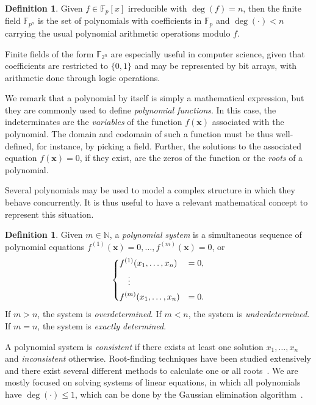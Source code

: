 \documentclass[12pt, a4paper, oneside]{memoir}
\theoremstyle{definition}
\newtheorem{definition}[theorem]{Definition}
\begin{document}
\begin{definition}
  Given $f \in \mathbb{F}_{p}[x]$ irreducible with $\deg(f) = n$, then the finite field $\mathbb{F}_{p^{n}}$ is the set of polynomials with coefficients in $\mathbb{F}_{p}$ and $\deg(\cdot) < n$ carrying the usual polynomial arithmetic operations modulo $f$.
\end{definition}

Finite fields of the form $\mathbb{F}_{2^{n}}$ are especially useful in computer science, given that coefficients are restricted to $\{0, 1\}$ and may be represented by bit arrays, with arithmetic done through logic operations.

We remark that a polynomial by itself is simply a mathematical expression, but they are commonly used to define \emph{polynomial functions}. In this case, the indeterminates are the \emph{variables} of the function $f(\mathbf{x})$ associated with the polynomial. The domain and codomain of such a function must be thus well-defined, for instance, by picking a field. Further, the solutions to the associated equation $f(\mathbf{x}) = 0$, if they exist, are the zeros of the function or the \emph{roots} of a polynomial. 

Several polynomials may be used to model a complex structure in which they behave concurrently. It is thus useful to have a relevant mathematical concept to represent this situation.

\begin{definition}\label{def:poly-sys}
  Given $m \in \mathbb{N}$, a \emph{polynomial system} is a simultaneous sequence of polynomial equations $f^{(1)}(\mathbf{x}) = 0, \dots, f^{(m)}(\mathbf{x}) = 0$, or
  \begin{align}
    \begin{dcases}
      f^{(1)}(x_{1}, \dots, x_{n}) &= 0, \\
      \quad \vdots \\
      f^{(m)}(x_{1}, \dots, x_{n}) &= 0.
    \end{dcases}
  \end{align}
  If $m > n$, the system is \emph{overdetermined}. If $m < n$, the system is \emph{underdetermined}. If $m = n$, the system is \emph{exactly determined}.
\end{definition}

A polynomial system is \emph{consistent} if there exists at least one solution $x_{1}, \dots, x_{n}$ and \emph{inconsistent} otherwise. Root-finding techniques have been studied extensively and there exist several different methods to calculate one or all roots~\cite[Chap.~9]{Press:2007}. We are mostly focused on solving systems of linear equations, in which all polynomials have $\deg(\cdot) \leq 1$, which can be done by the Gaussian elimination algorithm~\cite[Sec.~2.2]{Press:2007}.
\end{document}
